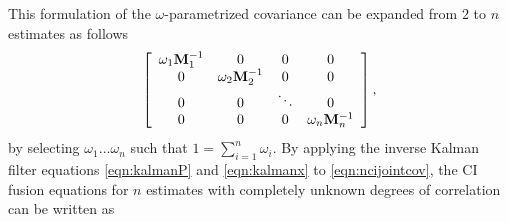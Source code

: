 This formulation of the $\omega$-parametrized covariance can be expanded from $2$ to $n$ estimates as follows
\begin{equation}\label{eqn:ncijointcov}
\left[\begin{array}{cccc}
    \omega_1\mathbf{M}^{-1}_1 &                    0 &                    0 &                    0 \\
                       0 & \omega_2\mathbf{M}^{-1}_2 &                    0 &                    0 \\
                       0 &                    0 &               \ddots &                    0 \\
                       0 &                    0 &                    0 & \omega_n\mathbf{M}^{-1}_n
\end{array}\right],
\end{equation}
by selecting $\omega_1\dots\omega_n$ such that $1=\sum_{i=1}^n\omega_i$. By applying the inverse Kalman filter equations
\ref{eqn:kalmanP} and \ref{eqn:kalmanx} to \ref{eqn:ncijointcov}, the CI fusion equations for $n$ estimates with 
completely unknown degrees of correlation can be written as
